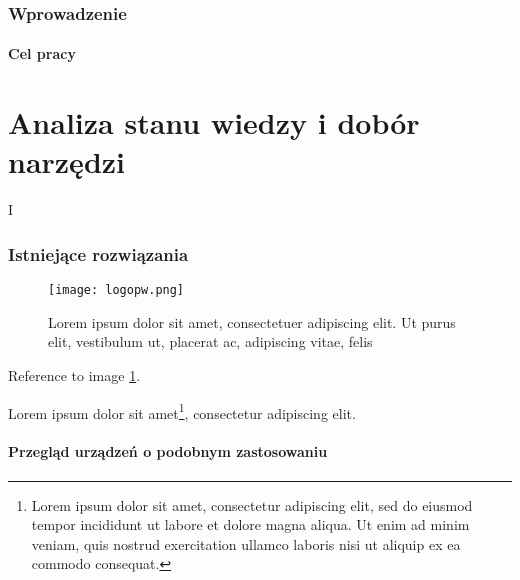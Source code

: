 \section*{Wprowadzenie}
    \noindent\lipsum[1-3]

    \subsection*{Cel pracy}
        \noindent\lipsum[4-5]

\cleardoublepage
\part{Analiza stanu wiedzy i dobór narzędzi}{I}

\noindent\lipsum[1-3]
\clearpage\section{Istniejące rozwiązania}
\noindent\lipsum[1-3]

\begin{figure}[!h]
    \centering \texttt{[image: logopw.png]}
    
    \caption{Lorem ipsum dolor sit amet, consectetuer adipiscing elit. Ut purus
    elit, vestibulum ut, placerat ac, adipiscing vitae, felis}
    \label{fig:tradycyjne-logo-pw}
\end{figure}

\lipsum[1-3] Reference to image \ref{fig:tradycyjne-logo-pw}.

\lipsum[4] Lorem ipsum dolor sit amet\footnote{Lorem ipsum dolor sit amet, consectetur adipiscing elit, sed do eiusmod tempor incididunt ut labore et dolore magna aliqua. Ut enim ad minim veniam, quis nostrud exercitation ullamco laboris nisi ut aliquip ex ea commodo consequat.}, consectetur adipiscing elit.

\subsection{Przegląd urządzeń o podobnym zastosowaniu}


